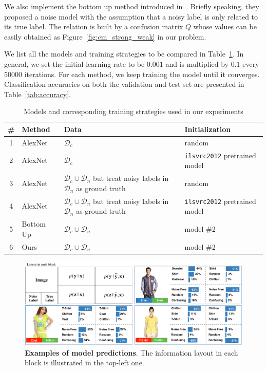 \documentclass[10pt,twocolumn,letterpaper]{article}
\begin{document}
We also implement the bottom up method introduced in~\cite{sukhbaatar2014learning}. Briefly speaking, they proposed a noise model with the assumption that a noisy label is only related to its true label. The relation is built by a confusion matrix $Q$ whose values can be easily obtained as Figure~\ref{fig:cm_strong_weak} in our problem.

We list all the models and training strategies to be compared in Table~\ref{tab:models}.  In general, we set the initial learning rate to be $0.001$ and is multiplied by $0.1$ every $50000$ iterations. For each method, we keep training the model until it converges. Classification accuracies on both the validation and test set are presented in Table~\ref{tab:accuracy}.

\begin{table}
\begin{center}
\begin{tabular}{c|p{3.5em}|p{8em}|p{6em}}
\hline
\# & Method & Data & Initialization \\
\hline\hline
1 & AlexNet & $\mathcal{D}_c$ & random \\
\hline
2 & AlexNet & $\mathcal{D}_c$ & \texttt{ilsvrc2012} pretrained model \\
\hline
3 & AlexNet & $\mathcal{D}_c \cup \mathcal{D}_n$ but treat noisy labels in $\mathcal{D}_n$ as ground truth & random \\
\hline
4 & AlexNet & $\mathcal{D}_c \cup \mathcal{D}_n$ but treat noisy labels in $\mathcal{D}_n$ as ground truth & \texttt{ilsvrc2012} pretrained model \\
\hline
5 & Bottom Up~\cite{sukhbaatar2014learning} & $\mathcal{D}_c \cup \mathcal{D}_n$ & model \#2 \\
\hline
6 & Ours & $\mathcal{D}_c \cup \mathcal{D}_n$ & model \#2 \\
\hline
\end{tabular}
\end{center}
\caption{Models and corresponding training strategies used in our experiments}
\label{tab:models}
\end{table}

\begin{figure}
\begin{center}
\end{center}
\includegraphics[width=1.0\linewidth]{figure/model_output.pdf}
\caption{\textbf{Examples of model predictions}. The information layout in each block is illustrated in the top-left one.}
\label{fig:model_output}
\end{figure}
\end{document}
